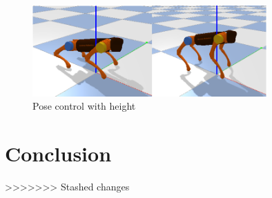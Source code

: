 \begin{figure}[htbp]
   \centering
   \includegraphics[width=0.8\textwidth]{figures/Pose_control_with_height.png}
   \caption{Pose control with height}
   \label{fig: Pose_control_with_height}
\end{figure}

\chapter{Conclusion}
>>>>>>> Stashed changes
